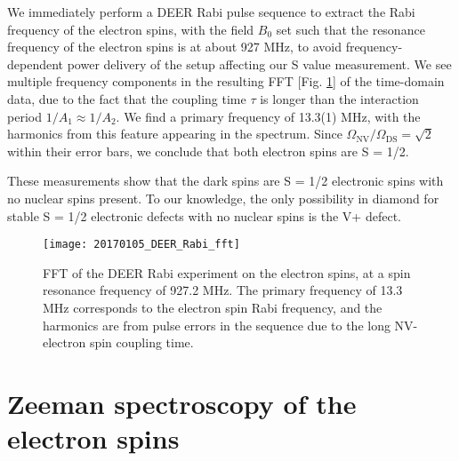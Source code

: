 \documentclass[%
 reprint,
 amsmath,amssymb,
 aps,
]{revtex4-1}
\begin{document}
We immediately perform a DEER Rabi pulse sequence to extract the Rabi frequency of the electron spins, with the field $B_0$ set such that the resonance frequency of the electron spins is at about 927 MHz, to avoid frequency-dependent power delivery of the setup affecting our S value measurement. We see multiple frequency components in the resulting FFT [Fig. \ref{deerrabi}] of the time-domain data, due to the fact that the coupling time $\tau$ is longer than the interaction period $1/A_{1} \approx 1/A_{2}$. We find a primary frequency of 13.3(1) MHz, with the harmonics from this feature appearing in the spectrum. Since $\Omega_{\text{NV}}/\Omega_{\text{DS}} = \sqrt{2}$ within their error bars, we conclude that both electron spins are S = 1/2. 

These measurements show that the dark spins are S = 1/2 electronic spins with no nuclear spins present.  To our knowledge, the only possibility in diamond for stable S = 1/2 electronic defects with no nuclear spins is the V+ defect. 

\begin{figure}[h!]
\centering
\texttt{[image: 20170105\_DEER\_Rabi\_fft]}
\caption{FFT of the DEER Rabi experiment on the electron spins, at a spin resonance frequency of 927.2 MHz. The primary frequency of 13.3 MHz corresponds to the electron spin Rabi frequency, and the harmonics are from pulse errors in the sequence due to the long NV-electron spin coupling time.}
\label{deerrabi}
\end{figure}

\section{Zeeman spectroscopy of the electron spins}
\end{document}
